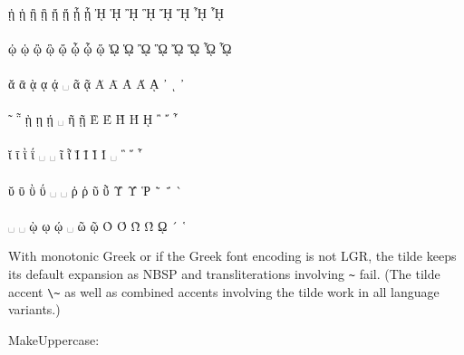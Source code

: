 \documentclass[a4paper]{article}
\begin{document}
{   \\
            ᾐ   ᾑ    ᾒ    ᾓ    ᾔ    ᾕ    ᾖ    ᾗ     ᾘ    ᾙ    ᾚ    ᾛ    ᾜ    ᾝ    ᾞ    ᾟ   \\
   \\
            ᾠ   ᾡ    ᾢ    ᾣ    ᾤ    ᾦ    ᾧ    ᾥ     ᾨ    ᾩ    ᾪ    ᾫ    ᾬ    ᾭ    ᾮ    ᾯ   \\
   \\
            ᾰ   ᾱ    ᾲ    ᾳ    ᾴ    ␣    ᾶ    ᾷ     Ᾰ    Ᾱ    Ὰ    Ά    ᾼ    ᾽    ι    ᾿   \\
 \\
            ῀   ῁    ῂ    ῃ    ῄ    ␣    ῆ    ῇ     Ὲ    Έ    Ὴ    Ή    ῌ    ῍     ῎   ῏   \\
    \\
            ῐ   ῑ    ῒ    ΐ    ␣    ␣    ῖ    ῗ     Ῐ    Ῑ    Ὶ    Ί    ␣    ῝     ῞   ῟   \\
 \\
            ῠ   ῡ    ῢ    ΰ    ␣    ␣    ῤ    ῥ     ῦ    ῧ    Ὺ    Ύ    Ῥ    ῭     ΅   `   \\
 \\
             ␣   ␣   ῲ    ῳ    ῴ    ␣    ῶ    ῷ     Ὸ    Ό    Ὼ    Ώ    ῼ    ´     ῾       \\
}

\begin{quote}
  \GreekExtended
\end{quote}

With monotonic Greek or if the Greek font encoding is not LGR, the tilde
keeps its default expansion as NBSP and transliterations involving \verb|~|
fail. (The tilde accent \verb|\~| as well as combined accents involving the
tilde work in all language variants.)

MakeUppercase:

\begin{quote}
  \MakeUppercase{\GreekExtended}
\end{quote}
\end{document}
